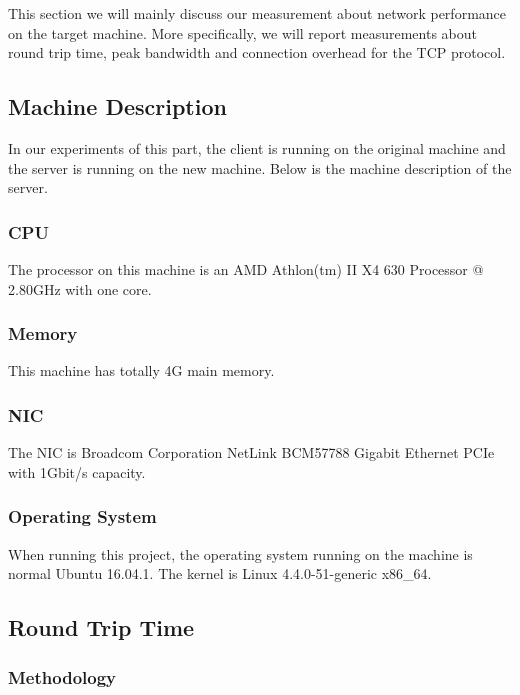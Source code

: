 
% 

This section we will mainly discuss our measurement about network performance on the target machine. More specifically, we will report measurements about round trip time, peak bandwidth and connection overhead for the TCP protocol.

\subsection{Machine Description}
\label{Network_machine_desc}
In our experiments of this part, the client is running on the original machine and the server is running on the new machine. Below is the machine description of the server.

\subsubsection{CPU}

The processor on this machine is an AMD Athlon(tm) II X4 630 Processor @ 2.80GHz with one core.

\subsubsection{Memory}

This machine has totally 4G main memory.

\subsubsection{NIC}

The NIC is Broadcom Corporation NetLink BCM57788 Gigabit Ethernet PCIe with 1Gbit/s capacity.

\subsubsection{Operating System}
When running this project, the operating system running on the machine is normal Ubuntu 16.04.1. The kernel is Linux 4.4.0-51-generic x86\_64.

\subsection{Round Trip Time}

\subsubsection{Methodology}

